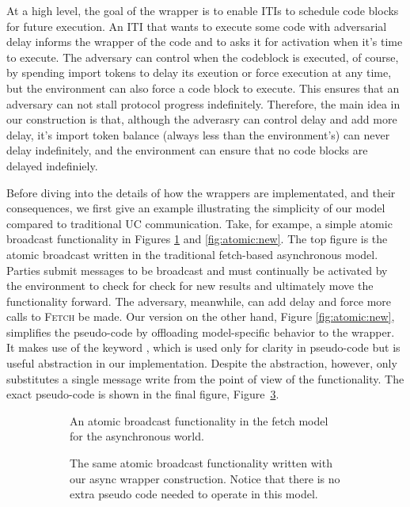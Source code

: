 At a high level, the goal of the wrapper is to enable ITIs to schedule code blocks for future execution.
An ITI that wants to execute some code with adversarial delay informs the wrapper of the code and to asks it for activation when it's time to execute.
The adversary can control when the codeblock is executed, of course, by spending import tokens to delay its exeution or force execution at any time, but the environment can also force a code block to execute.
This ensures that an adversary can not stall protocol progress indefinitely.
Therefore, the main idea in our construction is that, although the adverasry can control delay and add more delay, it's import token balance (always less than the environment's) can never delay indefinitely, and the environment can ensure that no code blocks are delayed indefiniely.

Before diving into the details of how the wrappers are implementated, and their consequences, we first give an example illustrating the simplicity of our model compared to traditional UC communication.
Take, for exampe, a simple atomic broadcast functionality in Figures \ref{fig:atomic:old} and \ref{fig:atomic:new}. 
The top figure is the atomic broadcast written in the traditional fetch-based asynchronous model.
Parties submit messages to be broadcast and must continually be activated by the environment to check for check for new results and ultimately move the functionality forward.
The adversary, meanwhile, can add delay and force more calls to \textsc{Fetch} be made.
Our version on the other hand, Figure \ref{fig:atomic:new}, simplifies the pseudo-code by offloading model-specific behavior to the wrapper.
It makes use of the keyword \Eventually, which is used only for clarity in pseudo-code but is useful abstraction in our implementation.
Despite the abstraction, however, \Eventually only substitutes a single message write from the point of view of the functionality.
The exact pseudo-code is shown in the final figure, Figure~\ref{fig:atomic:real}.

\begin{figure}[h]
\begin{subfigure}{\columnwidth}
	
	\caption{An atomic broadcast functionality in the fetch model for the asynchronous world.}
	\label{fig:atomic:old}
\end{subfigure}
\begin{subfigure}{\columnwidth}
	
	\caption{The same atomic broadcast functionality written with our async wrapper construction. Notice that there is no extra pseudo code needed to operate in this model.}
\end{subfigure}
\begin{subfigure}{\columnwidth}
	
	\label{fig:atomic:real}
\end{subfigure}
\end{figure}

